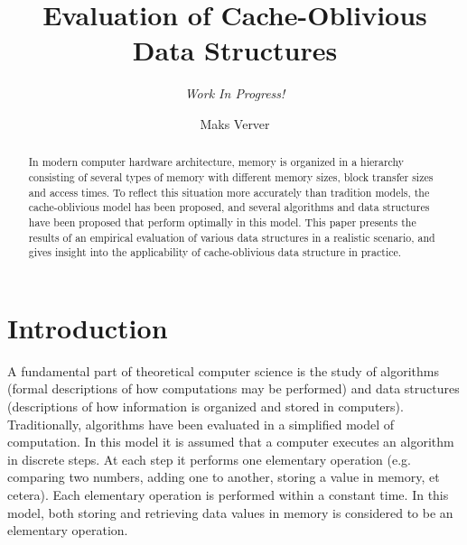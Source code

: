 \documentclass{acm_proc_article-sp}
\begin{document}
\title{Evaluation of Cache-Oblivious Data Structures}
\subtitle{\textit{Work In Progress!}}

\author{Maks Verver\\ }


\maketitle

\begin{abstract}
In modern computer hardware architecture, memory is organized in a hierarchy
consisting of several types of memory with different memory sizes, block
transfer sizes and access times. To reflect this situation more accurately
than tradition models, the cache-oblivious model has been proposed, and several
algorithms and data structures have been proposed that perform optimally in
this model.
This paper presents the results of an empirical evaluation of various data
structures in a realistic scenario, and gives insight into the applicability
of cache-oblivious data structure in practice.
\end{abstract}



\section{Introduction}
A fundamental part of theoretical computer science is the study of algorithms (formal descriptions of how computations may be performed) and data structures (descriptions of how information is organized and stored in computers). Traditionally, algorithms have been evaluated in a simplified model of computation. In this model it is assumed that a computer executes an algorithm in discrete steps. At each step it performs one elementary operation (e.g. comparing two numbers, adding one to another, storing a value in memory, et cetera). Each elementary operation is performed within a constant time. In this model, both storing and retrieving data values in memory is considered to be an elementary operation.
\end{document}
